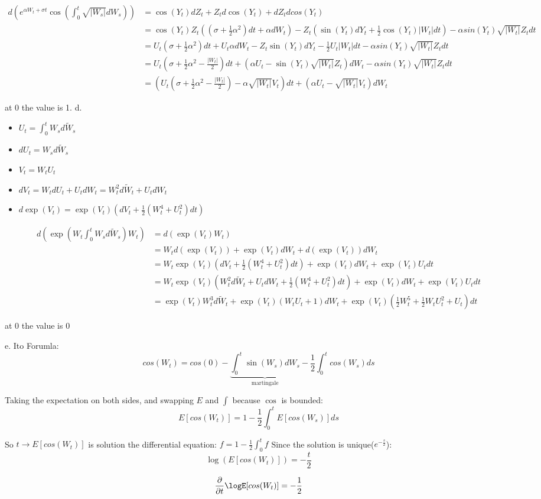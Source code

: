 \documentclass[11pt]{article}
\begin{document}
\begin{align*}
d(e^{\alpha W_t + \sigma t} \cos(\int_0^t \sqrt{|W_s|} dW_s))
&= \cos(Y_t) dZ_t + Z_t d\cos(Y_t) + dZ_t dcos(Y_t)
\\&= \cos(Y_t)  Z_t( (\sigma + \frac12 \alpha^2)dt + \alpha dW_t) - Z_t (\sin(Y_t) dY_t + \frac12 \cos(Y_t) |W_t| dt)
- \alpha sin(Y_t)\sqrt{|W_t|}Z_t dt
\\&= U_t  (\sigma + \frac12 \alpha^2)dt + U_t \alpha dW_t - Z_t \sin(Y_t) dY_t - \frac12 U_t |W_t| dt
- \alpha sin(Y_t)\sqrt{|W_t|}Z_t dt
\\&= U_t(\sigma + \frac12 \alpha^2 - \frac{|W_t|}2) dt + (\alpha U_t - \sin(Y_t) \sqrt{|W_t|}Z_t) dW_t
- \alpha sin(Y_t)\sqrt{|W_t|}Z_t dt
\\&= \left(U_t(\sigma + \frac12 \alpha^2 - \frac{|W_t|}2) - \alpha  \sqrt{|W_t|} V_t \right) dt + (\alpha U_t -  \sqrt{|W_t|} V_t) dW_t
\end{align*}

at \(0\) the value is 1.
d.
\begin{itemize}
\item \(U_t = \int_0^t W_s d\tilde W_s\)
\item \(dU_t = W_s d\tilde W_s\)
\item \(V_t = W_t U_t\)
\item \(dV_t = W_t dU_t + U_t dW_t = W_t^2 d\tilde W_t + U_t dW_t\)
\item \(d\exp(V_t) = \exp(V_t)(dV_t + \frac12( W_t^4 + U_t^2)dt)\)
\end{itemize}


\begin{align*}
d(\exp(W_t \int_0^t W_s d\tilde W_s)W_t)
& = d(\exp(V_t)W_t)
\\& = W_t d(\exp(V_t)) + \exp(V_t) dW_t + d(\exp(V_t)) dW_t
\\& = W_t \exp(V_t)(dV_t + \frac12( W_t^4 + U_t^2)dt) + \exp(V_t) dW_t  + \exp(V_t) U_t dt
\\& = W_t \exp(V_t)(W_t^2 d\tilde W_t + U_t dW_t + \frac12(W_t^4 + U_t^2)dt) + \exp(V_t) dW_t  + \exp(V_t) U_t dt
\\& = \exp(V_t) W_t^3 d\tilde W_t + \exp(V_t) \left( W_t U_t + 1 \right) dW_t  + \exp(V_t) \left(\frac12 W_t^5 + \frac12 W_t U_t^2 +  U_t\right) dt
\end{align*}

at \(0\) the value is \(0\)

e.
Ito Forumla:
$$cos(W_t) = cos(0) - \underbrace{\int_0^t \sin(W_s) dW_s}_{\text{martingale}} - \frac12 \int_0^t cos(W_s)ds$$

Taking the expectation on both sides, and swapping \(E\) and \(\int\) because \(\cos\) is bounded:
$$E[cos(W_t)] = 1 - \frac12 \int_0^t E[cos(W_s)] ds$$

So \(t \rightarrow E[cos(W_t)]\) is solution the differential equation: \(f = 1 - \frac12 \int_0^t f\)
Since the solution is unique(\(e^{-\frac s2}\)):
$$\log(E[cos(W_t)]) = -\frac{t}2$$


$$\frac{\partial}{\partial t} \logE[cos(W_t)] = -\frac12$$
\end{document}
